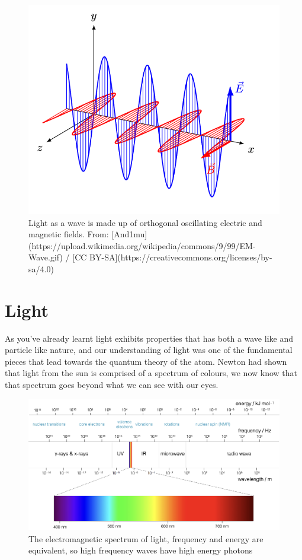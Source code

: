\documentclass[
]{book}
\begin{document}
\begin{figure}

{\centering \includegraphics[width=0.6\linewidth]{images/EM-Wave} 

}

\caption{Light as a wave is made up of orthogonal oscillating electric and magnetic fields. From: [And1mu](https://upload.wikimedia.org/wikipedia/commons/9/99/EM-Wave.gif) / [CC BY-SA](https://creativecommons.org/licenses/by-sa/4.0)}\label{fig:EMWave}
\end{figure}

\hypertarget{sec:Light}{%
\section{Light}\label{sec:Light}}

As you've already learnt light exhibits properties that has both a wave like and particle like nature, and our understanding of light was one of the fundamental pieces that lead towards the quantum theory of the atom. Newton had shown that light from the sun is comprised of a spectrum of colours, we now know that that spectrum goes beyond what we can see with our eyes.

\begin{figure}
\includegraphics[width=1\linewidth]{images/EMspectrumspectroscopy} \caption{The electromagnetic spectrum of light, frequency and energy are equivalent, so high frequency waves have high energy photons}\label{fig:EMspect}
\end{figure}
\end{document}
